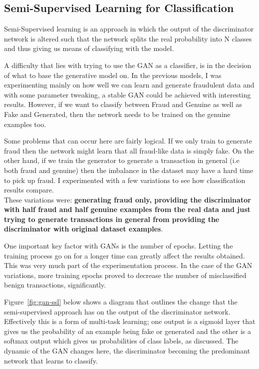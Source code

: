\documentclass[12pt,a4paper,twoside]{report}
\begin{document}
\subsection{Semi-Supervised Learning for Classification}

Semi-Supervised learning\cite{odena2016semi} is an approach in which the output of the discriminator network is altered such that the network splits the real probability into N classes and thus giving us means of classifying with the model. 

A difficulty that lies with trying to use the GAN as a classifier, is in the decision of what to base the generative model on. In the previous models, I was experimenting mainly on how well we can learn and generate fraudulent data and with some parameter tweaking, a stable GAN could be achieved with interesting results. However, if we want to classify between Fraud and Genuine as well as Fake and Generated, then the network needs to be trained on the genuine examples too. 

Some problems that can occur here are fairly logical. If we only train to generate fraud then the network might learn that all fraud-like data is simply fake. On the other hand, if we train the generator to generate a transaction in general (i.e both fraud and genuine) then the imbalance in the dataset may have a hard time to pick up fraud. 
I experimented with a few variations to see how classification results compare. \\
These variations were: \textbf{generating fraud only, providing the discriminator with half fraud and half genuine examples from the real data and just trying to generate transactions in general from providing the discriminator with original dataset examples}.

One important key factor with GANs is the number of epochs. Letting the training process go on for a longer time can greatly affect the results obtained. This was very much part of the experimentation process. In the case of the GAN variations, more training epochs proved to decrease the number of misclassified benign transactions, significantly.

Figure~\ref{fig:gan-ssl} below shows a diagram that outlines the change that the semi-supervised approach has on the output of the discriminator network. Effectively this is a form of multi-task learning; one output is a sigmoid layer that gives us the probability of an example being fake or generated and the other is a softmax output which gives us probabilities of class labels, as discussed. The dynamic of the GAN changes here, the discriminator becoming the predominant network that learns to classify. 
\end{document}
